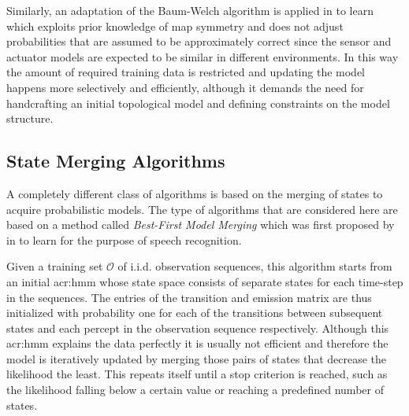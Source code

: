 Similarly, an adaptation of the Baum-Welch algorithm is applied in \cite{koenig1996unsupervised} to learn  which exploits prior knowledge of map symmetry and does not adjust probabilities that are assumed to be approximately correct since the sensor and actuator models are expected to be similar in different environments.
In this way the amount of required training data is restricted and updating the model happens more selectively and efficiently, although it demands the need for handcrafting an initial topological model and defining constraints on the model structure.


\subsection{State Merging Algorithms}
\label{sec:state-merging}

A completely different class of algorithms is based on the merging of states to acquire probabilistic models.
The type of algorithms that are considered here are based on a method called \textit{Best-First Model Merging} which was first proposed by \citeauthor{stolcke1994best} in \cite{stolcke1994best} to learn  for the purpose of speech recognition.

Given a training set $\mathcal{O}$ of i.i.d. observation sequences, this algorithm starts from an initial \acrshort{acr:hmm} whose state space consists of separate states for each time-step in the sequences.
The entries of the transition and emission matrix are thus initialized with probability one for each of the transitions between subsequent states and each percept in the observation sequence respectively.
Although this \acrshort{acr:hmm} explains the data perfectly it is usually not efficient and therefore the model is iteratively updated by merging those pairs of states that decrease the likelihood the least.
This repeats itself until a stop criterion is reached, such as the likelihood falling below a certain value or reaching a predefined number of states.

